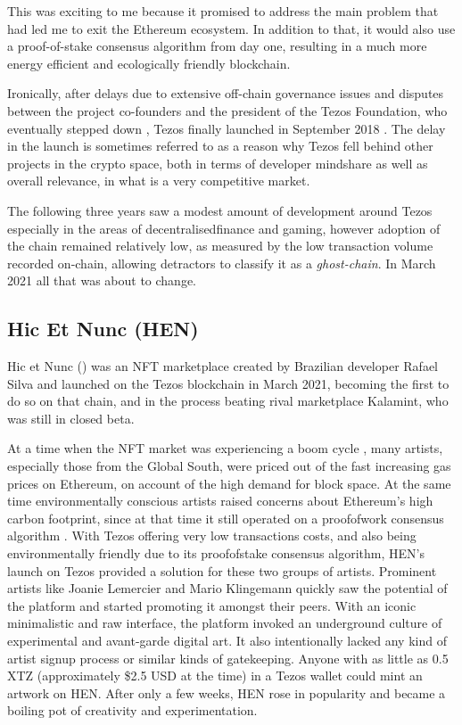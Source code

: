 This was exciting to me because it promised to address the main problem that had led me to exit the Ethereum ecosystem. In addition to that, it would also use a proof-of-stake consensus algorithm from day one, resulting in a much more energy efficient and ecologically friendly blockchain.


Ironically, after delays due to extensive \gls{off-chain} governance issues and disputes between the project co-founders and the president of the Tezos Foundation, who eventually stepped down \cite{irreraExclusiveTezosFounders2017}, Tezos finally launched in September 2018 \cite{daleBillionTezosBlockchain2018}. The delay in the launch is sometimes referred to as a reason why Tezos fell behind other projects in the crypto space, both in terms of developer mindshare as well as overall relevance, in what is a very competitive market.

The following three years saw a modest amount of development around Tezos especially in the areas of \gls{decentralisedfinance} and gaming, however adoption of the chain remained relatively low, as measured by the low transaction volume recorded on-chain, allowing detractors to classify it as a \emph{\gls{ghost-chain}}. In March 2021 all that was about to change.


\subsection{Hic Et Nunc (HEN)}


Hic et Nunc () was an NFT marketplace created by Brazilian developer Rafael Silva and launched on the Tezos blockchain in March 2021, becoming the first to do so on that chain, and in the process beating rival marketplace Kalamint, who was still in closed beta.

At a time when the NFT market was experiencing a boom cycle \needcite , many artists, especially those from the Global South, were priced out of the fast increasing gas prices on Ethereum, on account of the high demand for block space. At the same time environmentally conscious artists raised concerns about Ethereum's high carbon footprint, since at that time it still operated on a \gls{proofofwork} consensus algorithm \cite{lemercierProblemEthereumCryptoArt2021}. With Tezos offering very low transactions costs, and also being environmentally friendly due to its \gls{proofofstake} consensus algorithm, HEN's launch on Tezos provided a solution for these two groups of artists. Prominent artists like Joanie Lemercier and Mario Klingemann quickly saw the potential of the platform and started promoting it amongst their peers. With an iconic minimalistic and raw interface, the platform invoked an underground culture of experimental and avant-garde digital art. It also intentionally lacked any kind of artist signup process or similar kinds of gatekeeping. Anyone with as little as 0.5 XTZ (approximately \$2.5 USD at the time) in a Tezos wallet could mint an artwork on HEN. After only a few weeks, HEN rose in popularity and became a boiling pot of creativity and experimentation.

